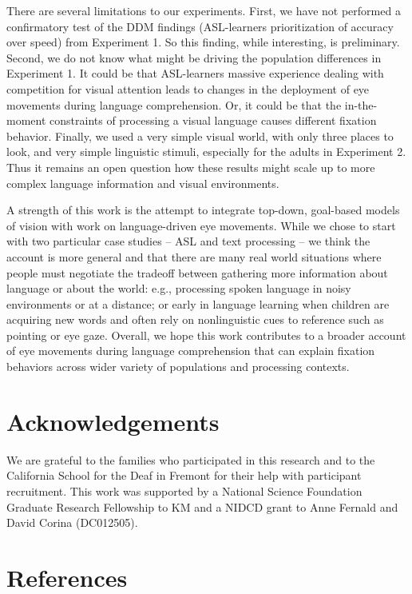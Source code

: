 \documentclass[10pt, letterpaper]{article}
\begin{document}
There are several limitations to our experiments. First, we have not
performed a confirmatory test of the DDM findings (ASL-learners
prioritization of accuracy over speed) from Experiment 1. So this
finding, while interesting, is preliminary. Second, we do not know what
might be driving the population differences in Experiment 1. It could be
that ASL-learners massive experience dealing with competition for visual
attention leads to changes in the deployment of eye movements during
language comprehension. Or, it could be that the in-the-moment
constraints of processing a visual language causes different fixation
behavior. Finally, we used a very simple visual world, with only three
places to look, and very simple linguistic stimuli, especially for the
adults in Experiment 2. Thus it remains an open question how these
results might scale up to more complex language information and visual
environments.

A strength of this work is the attempt to integrate top-down, goal-based
models of vision with work on language-driven eye movements. While we
chose to start with two particular case studies -- ASL and text
processing -- we think the account is more general and that there are
many real world situations where people must negotiate the tradeoff
between gathering more information about language or about the world:
e.g., processing spoken language in noisy environments or at a distance;
or early in language learning when children are acquiring new words and
often rely on nonlinguistic cues to reference such as pointing or eye
gaze. Overall, we hope this work contributes to a broader account of eye
movements during language comprehension that can explain fixation
behaviors across wider variety of populations and processing contexts.

\section{Acknowledgements}\label{acknowledgements}

We are grateful to the families who participated in this research and to
the California School for the Deaf in Fremont for their help with
participant recruitment. This work was supported by a National Science
Foundation Graduate Research Fellowship to KM and a NIDCD grant to Anne
Fernald and David Corina (DC012505).

\section{References}\label{references}
\end{document}
